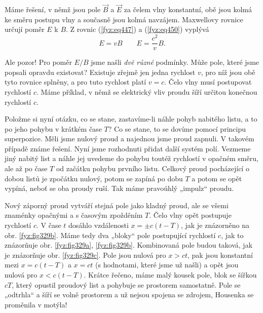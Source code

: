   Máme řešení, v němž jsou pole \(\vec{B}\) a \(\vec{E}\) za čelem vlny konstantní, obě jsou kolmá 
  ke směru postupu vlny a současně jsou kolmá navzájem. Maxwellovy rovnice určují poměr \(E\) k 
  \(B\). Z rovnic (\ref{fyz:eq447}) a (\ref{fyz:eq450}) vyplývá
  \begin{equation*}
    E = vB \qquad E = \frac{c^2}{v}B.
  \end{equation*}
  
  Ale pozor! Pro poměr \(E/B\) jsme našli \emph{dvě různé} podmínky. Může pole, které jsme popsali 
  opravdu existovat? Existuje zřejmě jen jedna rychlost \(v\), pro níž jsou obě tyto rovnice 
  splněny, a pro tuto rychlost platí \(v = c\). Čelo vlny musí postupovat rychlostí \(c\). Máme 
  příklad, v němž se elektrický vliv proudu šíří určitou konečnou rychlostí \(c\). 
  
  Položme si nyní otázku, co se stane, zastavíme-li náhle pohyb nabitého listu, a to po jeho pohybu 
  v krátkém čase \(T\)? Co se stane, to se dovíme pomocí principu superpozice. Měli jsme nulový 
  proud a najednou jsme proud zapnuli. V takovém případě známe řešení. Nyní jsme rozhodnuti přidat 
  další systém polí. Vezmeme jiný nabitý list a náhle jej uvedeme do pohybu toutéž rychlostí v 
  opačném směru, ale až po čase \(T\) od začátku pohybu prvního listu. Celkový proud pocházející o 
  dobou listů je zpočátku nulový, potom se zapíná po dobu \(T\) a potom se opět vypíná, neboť se 
  oba proudy ruší. Tak máme pravoúhlý „impulz“ proudu. 
  
  Nový záporný proud vytváří stejná pole jako kladný proud, ale se všemi znaménky opačnými a s 
  časovým zpožděním \(T\). Čelo vlny opět postupuje rychlostí \(c\). V čase \(t\) dosáhlo 
  vzdálenosti \(x=\pm c(t-T)\), jak je znázorněno na obr. \ref{fyz:fig329b}. Máme tedy dva „bloky“ 
  pole postupující rychlostí \(c\), jak to znázorňuje obr. \ref{fyz:fig329a}, \ref{fyz:fig329b}. 
  Kombinovaná pole budou taková, jak je znázorňuje obr. \ref{fyz:fig329c}. Pole jsou nulová pro 
  \(x>ct\), pak jsou konstantní mezi \(x = c(t - T)\) a \(x = ct\) (s hodnotami, které jsme už 
  našli) a opět jsou nulová pro \(x<c(t-T)\). Krátce řečeno, máme malý kousek pole, blok se šířkou 
  \(cT\), který opustil proudový list a pohybuje se prostorem samostatně. Pole se „odtrhla“ a šíří 
  se volně prostorem a už nejsou spojena se zdrojem, Housenka se proměnila v motýla! 
  
